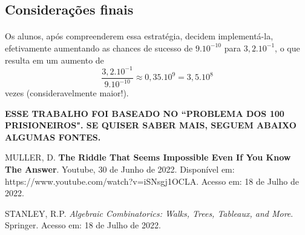 \documentclass{article}
\begin{document}
    \subsection{Considera\c c\~oes finais}
        \paragraph{}Os alunos, ap\'os compreenderem essa estrat\'egia, decidem implement\'a-la, efetivamente aumentando as chances de sucesso de $9.10^{-10}$ para $3,2.10^{-1}$, o que
        resulta em um aumento de 
        $$
            \frac{3,2.10^{-1}}{9.10^{-10}} \approx 0,35.10^{9} = 3,5.10^{8}
        $$
        vezes (consideravelmente maior!). 

    \begin{center}
        \textbf{\MakeUppercase{Esse trabalho foi baseado no ``Problema dos 100 Prisioneiros". Se quiser saber mais, seguem abaixo algumas fontes.}}
    \end{center}

    \begin{thebibliography}{Xyz12}
        \item MULLER, D. \textbf{The Riddle That Seems Impossible Even If You Know The Answer}. Youtube, 30 de Junho de 2022. Dispon\'ivel em: https://www.youtube.com/watch?v=iSNsgj1OCLA. Acesso em: 18 de Julho de 2022.
        \item STANLEY, R.P. \textit{Algebraic Combinatorics: Walks, Trees, Tableaux, and More}. Springer. Acesso em: 18 de Julho de 2022.
    \end{thebibliography}
\end{document}
